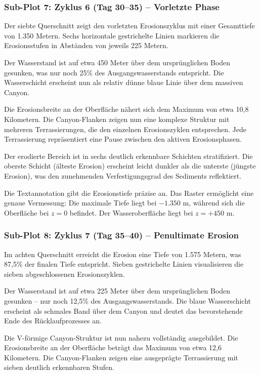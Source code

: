 \subsubsection*{Sub-Plot 7: Zyklus 6 (Tag 30--35) -- Vorletzte Phase}

Der siebte Querschnitt zeigt den vorletzten Erosionszyklus mit einer Gesamttiefe von 1.350 Metern. Sechs horizontale gestrichelte Linien markieren die Erosionsstufen in Abständen von jeweils 225 Metern.

Der Wasserstand ist auf etwa 450 Meter über dem ursprünglichen Boden gesunken, was nur noch 25\% des Ausgangswasserstands entspricht. Die Wasserschicht erscheint nun als relativ dünne blaue Linie über dem massiven Canyon.

Die Erosionsbreite an der Oberfläche nähert sich dem Maximum von etwa 10,8 Kilometern. Die Canyon-Flanken zeigen nun eine komplexe Struktur mit mehreren Terrassierungen, die den einzelnen Erosionszyklen entsprechen. Jede Terrassierung repräsentiert eine Pause zwischen den aktiven Erosionsphasen.

Der erodierte Bereich ist in sechs deutlich erkennbare Schichten stratifiziert. Die oberste Schicht (älteste Erosion) erscheint leicht dunkler als die unterste (jüngste Erosion), was den zunehmenden Verfestigungsgrad des Sediments reflektiert.

Die Textannotation gibt die Erosionstiefe präzise an. Das Raster ermöglicht eine genaue Vermessung: Die maximale Tiefe liegt bei $-1.350$ m, während sich die Oberfläche bei $z = 0$ befindet. Der Wasseroberfläche liegt bei $z = +450$ m.

\subsubsection*{Sub-Plot 8: Zyklus 7 (Tag 35--40) -- Penultimate Erosion}

Im achten Querschnitt erreicht die Erosion eine Tiefe von 1.575 Metern, was 87,5\% der finalen Tiefe entspricht. Sieben gestrichelte Linien visualisieren die sieben abgeschlossenen Erosionszyklen.

Der Wasserstand ist auf etwa 225 Meter über dem ursprünglichen Boden gesunken -- nur noch 12,5\% des Ausgangswasserstands. Die blaue Wasserschicht erscheint als schmales Band über dem Canyon und deutet das bevorstehende Ende des Rücklaufprozesses an.

Die V-förmige Canyon-Struktur ist nun nahezu vollständig ausgebildet. Die Erosionsbreite an der Oberfläche beträgt das Maximum von etwa 12,6 Kilometern. Die Canyon-Flanken zeigen eine ausgeprägte Terrassierung mit sieben deutlich erkennbaren Stufen.

